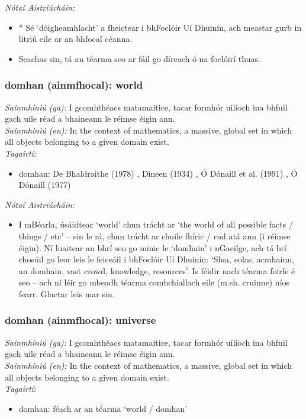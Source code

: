  \noindent \textit{Nótaí Aistriúcháin:}
\begin{itemize}
	\item * Sé `dóigheamhlacht' a fheictear i bhFoclóir Uí Dhuinín, ach meastar gurb in litriú eile ar an bhfocal céanna.
	\item Seachas sin, tá an téarma seo ar fáil go díreach ó na foclóirí thuas.
\end{itemize}


\subsubsection*{domhan (ainmfhocal): world}
 \noindent \textit{Sainmhíniú (ga):} I gcomhthéacs matamaitice, tacar formhór uilíoch ina bhfuil gach uile réad a bhaineann le réimse éigin ann.
\\
 \noindent \textit{Sainmhíniú (en):} In the context of mathematics, a massive, global set in which all objects belonging to a given domain exist.
\\
 \noindent \textit{Tagairtí:}
\begin{itemize}
	\item domhan: De Bhaldraithe (1978) \cite{de-bhaldraithe}, Dineen (1934) \cite{dineen}, Ó Dónaill et al. (1991) \cite{focloir-beag}, Ó Dónaill (1977) \cite{odonaill}
\end{itemize}

 \noindent \textit{Nótaí Aistriúcháin:}
\begin{itemize}
	\item I mBéarla, úsáidtear `world' chun trácht ar `the world of all possible facts / things / etc' -- sin le rá, chun trácht ar chuile fhíric / rud atá ann (i réimse éigin). Ní luaitear an bhrí seo go minic le `domhain' i nGaeilge, ach tá brí chosúil go leor leis le feiceáil i bhFoclóir Uí Dhuinín: `Slua, eolas, acmhainn, an domhain, vast crowd, knowledge, resources'. Is féidir nach téarma foirfe é seo -- ach ní léir go mbeadh téarma comhchiallach eile (m.sh. cruinne) níos fearr. Glactar leis mar sin.
\end{itemize}


\subsubsection*{domhan (ainmfhocal): universe}
 \noindent \textit{Sainmhíniú (ga):} I gcomhthéacs matamaitice, tacar formhór uilíoch ina bhfuil gach uile réad a bhaineann le réimse éigin ann.
\\
 \noindent \textit{Sainmhíniú (en):} In the context of mathematics, a massive, global set in which all objects belonging to a given domain exist.
\\
 \noindent \textit{Tagairtí:}
\begin{itemize}
	\item domhan: féach ar an téarma `world / domhan'
\end{itemize}

